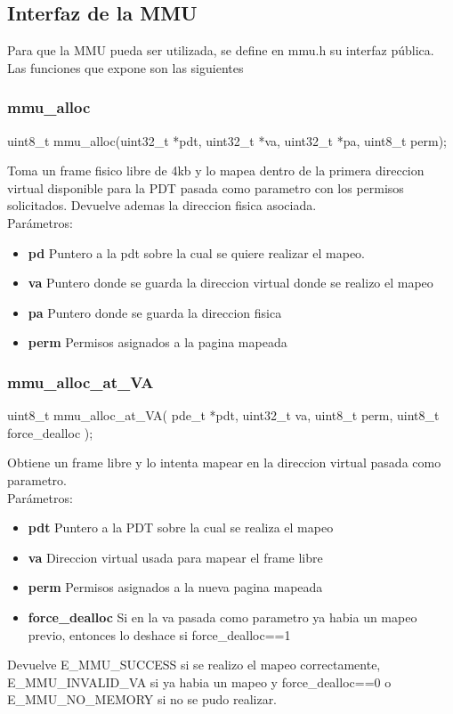 \subsection{Interfaz de la MMU}
Para que la MMU pueda ser utilizada, se define en mmu.h su interfaz pública. Las funciones que expone son las siguientes

\subsubsection{mmu\_alloc}
\begin{verbatimtab}
uint8_t mmu_alloc(uint32_t *pdt, uint32_t *va, uint32_t *pa, uint8_t perm);
\end{verbatimtab}
Toma un frame fisico libre de 4kb y lo mapea dentro de la primera direccion virtual disponible para la 
PDT pasada como parametro con los permisos solicitados. Devuelve ademas la direccion fisica asociada.\\
Parámetros:
\begin{itemize}
 \item \textbf{pd} Puntero a la pdt sobre la cual se quiere realizar el mapeo.
 \item \textbf{va} Puntero donde se guarda la direccion virtual donde se realizo el mapeo
 \item \textbf{pa} Puntero donde se guarda la direccion fisica
 \item \textbf{perm} Permisos asignados a la pagina mapeada
\end{itemize}


\subsubsection{mmu\_alloc\_at\_VA}
\begin{verbatimtab}
 uint8_t mmu_alloc_at_VA( pde_t *pdt, uint32_t va, uint8_t perm, uint8_t force_dealloc );
\end{verbatimtab}
Obtiene un frame libre y lo intenta mapear en la direccion virtual pasada como parametro.\\
Parámetros:
\begin{itemize}
 \item \textbf{pdt} Puntero a la PDT sobre la cual se realiza el mapeo
 \item \textbf{va} Direccion virtual usada para mapear el frame libre
 \item \textbf{perm} Permisos asignados a la nueva pagina mapeada
 \item \textbf{force\_dealloc} Si en la va pasada como parametro ya habia un mapeo previo, entonces lo deshace si force\_dealloc==1
\end{itemize}
Devuelve E\_MMU\_SUCCESS si se realizo el mapeo correctamente, E\_MMU\_INVALID\_VA si ya habia un mapeo y force\_dealloc==0 o E\_MMU\_NO\_MEMORY si no se pudo realizar.

